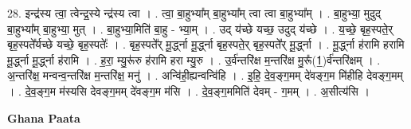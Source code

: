 \documentclass[17pt]{extarticle}
\begin{document}
28. इन्द्र॑स्य त्वा॒ त्वेन्द्र॒स्ये न्द्र॑स्य त्वा । . त्वा॒ बा॒हुभ्या᳚म् बा॒हुभ्या᳚म् त्वा त्वा बा॒हुभ्या᳚म् । . बा॒हुभ्या॒ मुदुद् बा॒हुभ्या᳚म् बा॒हुभ्या॒ मुत् । . बा॒हुभ्या॒मिति॑ बा॒हु - भ्या॒म् । . उद् य॑च्छे यच्छ॒ उदुद् य॑च्छे । . य॒च्छे॒ बृह॒स्पते॒र् बृह॒स्पते᳚र्यच्छे यच्छे॒ बृह॒स्पतेः᳚ । . बृह॒स्पते᳚र् मू॒र्द्ध्ना मू॒र्द्ध्ना बृह॒स्पते॒र् बृह॒स्पते᳚र् मू॒र्द्ध्ना । . मू॒र्द्ध्ना ह॑रामि हरामि मू॒र्द्ध्ना मू॒र्द्ध्ना ह॑रामि । . ह॒रा॒ म्यु॒रू॑रु ह॑रामि हरा म्यु॒रु । . उ॒र्व॑न्तरि॑क्ष म॒न्तरि॑क्ष मु॒रू᳚(1॒)र्व॑न्तरि॑क्षम् । . अ॒न्तरि॑क्ष॒ मन्वन्व॒न्तरि॑क्ष म॒न्तरि॑क्ष॒ मनु॑ । . अन्वि॑ही॒ह्यन्वन्वि॑हि । . इ॒हि॒ दे॒व॒ङ्ग॒मम् दे॑वङ्ग॒म मि॑हीहि देवङ्ग॒मम् । . दे॒व॒ङ्ग॒म म॑स्यसि देवङ्ग॒मम् दे॑वङ्ग॒म म॑सि । . दे॒व॒ङ्ग॒ममिति॑ देवम् - ग॒मम् । . अ॒सीत्य॑सि । \newline

\textbf{Ghana Paata } \newline
\end{document}
